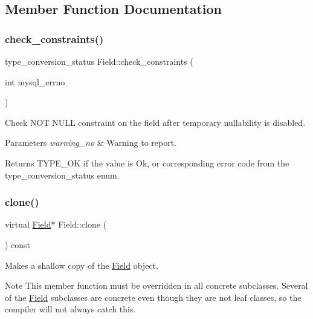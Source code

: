 \subsection{Member Function Documentation}
\mbox{\label{classField_a77929bc38a68304c577d7cb3f2cba3a0}} 
\subsubsection{\texorpdfstring{check\+\_\+constraints()}{check\_constraints()}}
{\footnotesize\ttfamily type\+\_\+conversion\+\_\+status Field\+::check\+\_\+constraints (\begin{DoxyParamCaption}\item[{int}]{mysql\+\_\+errno }\end{DoxyParamCaption})}

Check N\+OT N\+U\+LL constraint on the field after temporary nullability is disabled.


\begin{DoxyParams}{Parameters}
{\em warning\+\_\+no} & Warning to report.\\
\hline
\end{DoxyParams}
\begin{DoxyReturn}{Returns}
T\+Y\+P\+E\+\_\+\+OK if the value is Ok, or corresponding error code from the type\+\_\+conversion\+\_\+status enum. 
\end{DoxyReturn}
\mbox{\label{classField_a01a9a9aa3a618941e839b1b8793c969d}} 
\subsubsection{\texorpdfstring{clone()}{clone()}\hspace{0.1cm}{\footnotesize\ttfamily [1/2]}}
{\footnotesize\ttfamily virtual \mbox{\hyperlink{classField}{Field}}$\ast$ Field\+::clone (\begin{DoxyParamCaption}{ }\end{DoxyParamCaption}) const\hspace{0.3cm}{\ttfamily [pure virtual]}}

Makes a shallow copy of the \mbox{\hyperlink{classField}{Field}} object.

\begin{DoxyNote}{Note}
This member function must be overridden in all concrete subclasses. Several of the \mbox{\hyperlink{classField}{Field}} subclasses are concrete even though they are not leaf classes, so the compiler will not always catch this.
\end{DoxyNote}

